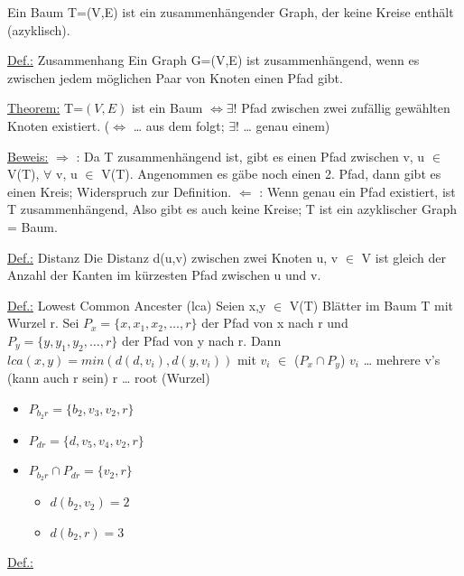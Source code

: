 \newline
Ein Baum T=(V,E) ist ein zusammenhängender Graph, der keine Kreise enthält (azyklisch).
\par\medskip
\underline{Def.:} Zusammenhang
\newline
Ein Graph G=(V,E) ist zusammenhängend, wenn es zwischen jedem möglichen Paar von Knoten einen Pfad gibt.
\par\medskip
\underline{Theorem:}
\newline
T=$\left(V,E\right)$ ist ein Baum $\Leftrightarrow \exists!$ Pfad zwischen zwei zufällig gewählten Knoten existiert.
($\Leftrightarrow$ … aus dem folgt; $\exists!$ … genau einem)
\par\medskip
\underline{Beweis:}
\newline
$\Rightarrow$ : Da T zusammenhängend ist, gibt es einen Pfad zwischen v, u $\in$ V(T), $\forall$ v, u $\in$ V(T).
Angenommen es gäbe noch einen 2. Pfad, dann gibt es einen Kreis; Widerspruch zur Definition.
\newline
$\Leftarrow$ : Wenn genau ein Pfad existiert, ist T zusammenhängend, Also gibt es auch keine Kreise; T ist ein azyklischer Graph = Baum.
\par\medskip
\underline{Def.:} Distanz
\newline
Die Distanz d(u,v) zwischen zwei Knoten u, v $\in$ V ist gleich der Anzahl der Kanten im kürzesten Pfad zwischen u und v.
\par\medskip
\underline{Def.:} Lowest Common Ancester (lca)
\newline
Seien x,y $\in$ V(T) Blätter im Baum T mit Wurzel r.
Sei $P_x = \{x, x_1 , x_2 , …, r\}$ der Pfad von x nach r und $P_y = \{y, y_1 , y_2 , …, r\}$ der Pfad von y nach r.
Dann $lca (x,y)=min(d(d,v_i), d(y,v_i))$ mit $v_i$ $\in$ ($P_x \cap P_y$)
\newline
$v_i$ … mehrere v's (kann auch r sein)
\newline
r … root (Wurzel)
\begin{itemize}
	\item $P_{{b_2}{r}} = \{b_2, v_3, v_2, r\}$
	\item $P_{dr} = \{d, v_5, v_4, v_2, r\}$
	\item $P_{{b_2}{r}} \cap P_{dr} = \{v_2, r\}$
	\begin{itemize}
		\item $d(b_2, v_2) = 2$
		\item $d(b_2, r) = 3$
	\end{itemize}
\end{itemize}
\underline{Def.:}

